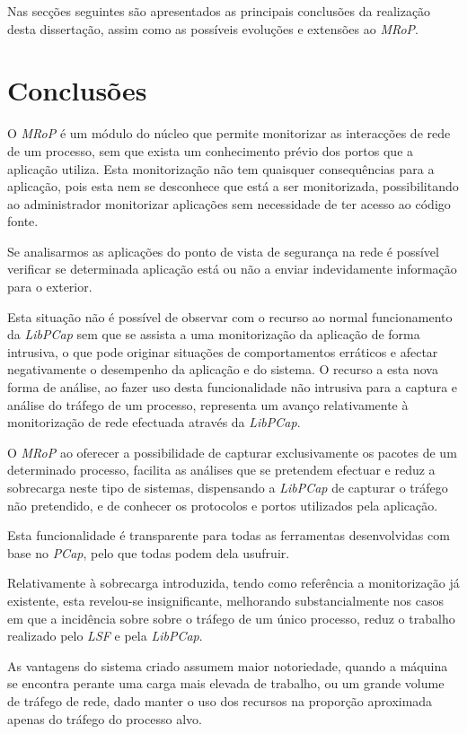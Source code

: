 Nas secções seguintes são apresentados as principais conclusões da realização desta dissertação, assim como as possíveis evoluções e extensões ao \textit{MRoP}.

\section{Conclusões}
\label{sec:conclusoes}

O \textit{MRoP} é um módulo do núcleo que permite monitorizar as interacções de rede de um processo, sem que exista um conhecimento prévio dos portos que a aplicação utiliza.
Esta monitorização não tem quaisquer consequências para a aplicação, pois esta nem se desconhece que está a ser monitorizada, possibilitando ao administrador monitorizar aplicações sem necessidade de ter acesso ao código fonte.

Se analisarmos as aplicações do ponto de vista de segurança na rede é possível verificar se determinada aplicação está ou não a enviar indevidamente informação para o exterior.

Esta situação não é possível de observar com o recurso ao normal funcionamento da \textit{LibPCap} sem que se assista a uma monitorização da aplicação de forma intrusiva, o que pode originar situações de comportamentos erráticos e afectar negativamente o desempenho da aplicação e do sistema.
O recurso a esta nova forma de análise, ao fazer uso desta funcionalidade não intrusiva para a captura e análise do tráfego de um processo, representa um avanço relativamente à monitorização de rede efectuada através da \textit{LibPCap}.

O \textit{MRoP} ao oferecer a possibilidade de capturar exclusivamente os pacotes de um determinado processo, facilita as análises que se pretendem efectuar e reduz a sobrecarga neste tipo de sistemas, dispensando a \textit{LibPCap} de capturar o tráfego não pretendido, e de conhecer os protocolos e portos utilizados pela aplicação.

Esta funcionalidade é transparente para todas as ferramentas desenvolvidas com base no \textit{PCap}, pelo que todas podem dela usufruir.

Relativamente à sobrecarga introduzida, tendo como referência a monitorização já existente, esta revelou-se insignificante, melhorando substancialmente nos casos em que a incidência sobre sobre o tráfego de um único processo, reduz o trabalho realizado pelo \textit{LSF} e pela \textit{LibPCap}.

As vantagens do sistema criado assumem maior notoriedade, quando a máquina se encontra perante uma carga mais elevada de trabalho, ou um grande volume de tráfego de rede, dado manter o uso dos recursos na proporção aproximada apenas do tráfego do processo alvo.

